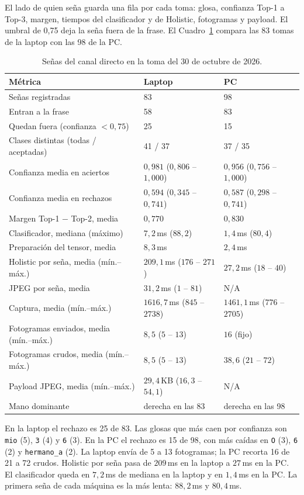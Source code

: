 El lado de quien seña guarda una fila por cada toma: glosa, confianza Top-1 a Top-3, margen, tiempos del clasificador y de Holistic, fotogramas y payload. El umbral de 0{,}75 deja la seña fuera de la frase. El Cuadro~\ref{tab:senas_vivo} compara las 83 tomas de la laptop con las 98 de la PC.

\begin{table}[H]
\centering
\footnotesize
\setlength{\tabcolsep}{3pt}
\caption{Señas del canal directo en la toma del 30 de octubre de 2026.}
\label{tab:senas_vivo}
\begin{tabularx}{\textwidth}{@{}>{\raggedright\arraybackslash}p{5.2cm} X X@{}}
\toprule
\textbf{Métrica} & \textbf{Laptop} & \textbf{PC} \\
\midrule
Señas registradas & 83 & 98 \\
Entran a la frase & 58 & 83 \\
Quedan fuera (confianza $< 0{,}75$) & 25 & 15 \\
Clases distintas (todas / aceptadas) & 41 / 37 & 37 / 35 \\
Confianza media en aciertos & $0{,}981$ ($0{,}806$ -- $1{,}000$) & $0{,}956$ ($0{,}756$ -- $1{,}000$) \\
Confianza media en rechazos & $0{,}594$ ($0{,}345$ -- $0{,}741$) & $0{,}587$ ($0{,}298$ -- $0{,}741$) \\
Margen Top-1 $-$ Top-2, media & $0{,}770$ & $0{,}830$ \\
Clasificador, mediana (máximo) & $7{,}2$\,ms ($88{,}2$) & $1{,}4$\,ms ($80{,}4$) \\
Preparación del tensor, media & $8{,}3$\,ms & $2{,}4$\,ms \\
Holistic por seña, media (mín.--máx.) & $209{,}1$\,ms ($176$ -- $271$) & $27{,}2$\,ms ($18$ -- $40$) \\
JPEG por seña, media & $31{,}2$\,ms ($1$ -- $81$) & N/A \\
Captura, media (mín.--máx.) & $1616{,}7$\,ms ($845$ -- $2738$) & $1461{,}1$\,ms ($776$ -- $2705$) \\
Fotogramas enviados, media (mín.--máx.) & $8{,}5$ ($5$ -- $13$) & $16$ (fijo) \\
Fotogramas crudos, media (mín.--máx.) & $8{,}5$ ($5$ -- $13$) & $38{,}6$ ($21$ -- $72$) \\
Payload JPEG, media (mín.--máx.) & $29{,}4$\,KB ($16{,}3$ -- $54{,}1$) & N/A \\
Mano dominante & derecha en las 83 & derecha en las 98 \\
\bottomrule
\end{tabularx}
\end{table}

En la laptop el rechazo es 25 de 83. Las glosas que más caen por confianza son \texttt{mio} (5), \texttt{3} (4) y \texttt{6} (3). En la PC el rechazo es 15 de 98, con más caídas en \texttt{O} (3), \texttt{6} (2) y \texttt{hermano\_a} (2). La laptop envía de 5 a 13 fotogramas; la PC recorta 16 de 21 a 72 crudos. Holistic por seña pasa de $209$\,ms en la laptop a $27$\,ms en la PC. El clasificador queda en $7{,}2$\,ms de mediana en la laptop y en $1{,}4$\,ms en la PC. La primera seña de cada máquina es la más lenta: $88{,}2$\,ms y $80{,}4$\,ms.
